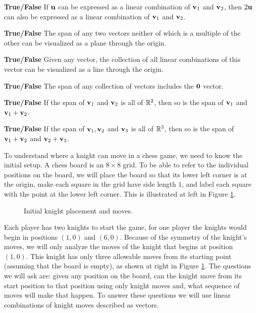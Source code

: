 \item \textbf{True/False} If $\mathbf{u}$ can be expressed as a linear combination of $\mathbf{v}_1$ and $\mathbf{v}_2$, then $2\mathbf{u}$ can also be expressed as a linear combination of $\mathbf{v}_1$ and $\mathbf{v}_2$.

\item \textbf{True/False} The span of any two vectors neither of which is a multiple of the other can be visualized as a plane through the origin.

\item \textbf{True/False} Given any vector, the collection of all linear combinations of this vector can be visualized as a line through the origin.

\item \textbf{True/False} The span of any collection of vectors includes the $\mathbf{0}$ vector.

\item \textbf{True/False} If the span of $\mathbf{v}_1$ and $\mathbf{v}_2$ is all of
$\mathbb{R}^2$, then so is the span of $\mathbf{v}_1$ and $\mathbf{v}_1+\mathbf{v}_2$.

\item \textbf{True/False} If the span of $\mathbf{v}_1, \mathbf{v}_2$ and $\mathbf{v}_3$ is all of $\mathbb{R}^3$, then so is the span of $\mathbf{v}_1+\mathbf{v}_2$ and $\mathbf{v}_2+\mathbf{v}_3$.

\ea
\ee


To understand where a knight can move in a chess game, we need to know the initial setup. A chess board is an $8 \times 8$ grid. To be able to refer to the individual positions on the board, we will place the board so that its lower left corner is at the origin, make each square in the grid have side length $1$, and label each square with the point at the lower left corner. This is illustrated at left in Figure \ref{F:knight_2}. 

\begin{figure}[h]
\begin{center}
 \hspace{0.2in} 
\caption{Initial knight placement and moves.}
\label{F:knight_2}
\end{center}
\end{figure}

Each player has two knights to start the game, for one player the knights would begin in positions $(1,0)$ and $(6,0)$. Because of the symmetry of the knight's moves, we will only analyze the moves of the knight that begins at position $(1,0)$. This knight has only three allowable moves from its starting point (assuming that the board is empty), as shown at right in Figure \ref{F:knight_2}. The questions we will ask are: given any position on the board, can the knight move from its start position to that position using only knight moves and, what sequence of moves will make that happen. To answer these questions we will use linear combinations of knight moves described as vectors.

